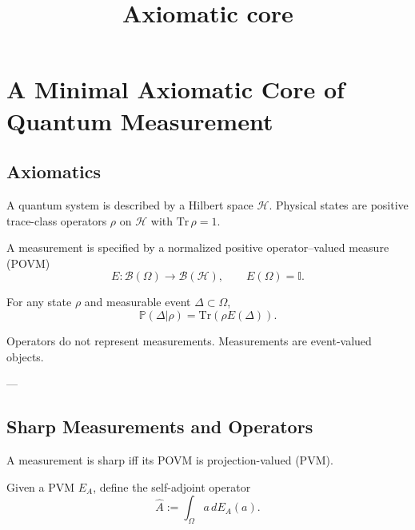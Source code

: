 \documentclass[11pt]{article}
\title{Axiomatic core}
\begin{document}
\maketitle

\section*{A Minimal Axiomatic Core of Quantum Measurement}

\subsection*{Axiomatics}

\begin{axiom}[States]
A quantum system is described by a Hilbert space $\mathcal H$.
Physical states are positive trace-class operators $\rho$ on $\mathcal H$
with $\mathrm{Tr}\,\rho=1$.
\end{axiom}

\begin{axiom}[Measurements]
A measurement is specified by a normalized positive operator--valued measure (POVM)
\[
E:\mathcal B(\Omega)\to\mathcal B(\mathcal H),
\qquad E(\Omega)=\mathbb I.
\]
\end{axiom}

\begin{axiom}
For any state $\rho$ and measurable event $\Delta\subset\Omega$,
\[
\mathbb P(\Delta|\rho)=\mathrm{Tr}(\rho E(\Delta)).
\]
\end{axiom}

\begin{remark}
Operators do not represent measurements.
Measurements are event-valued objects.
\end{remark}

---

\subsection*{Sharp Measurements and Operators}

\begin{definition}
A measurement is sharp iff its POVM is projection-valued (PVM).
\end{definition}

\begin{definition}
Given a PVM $E_A$, define the self-adjoint operator
\[
\hat A := \int_\Omega a\, dE_A(a).
\]
\end{definition}
\end{document}
